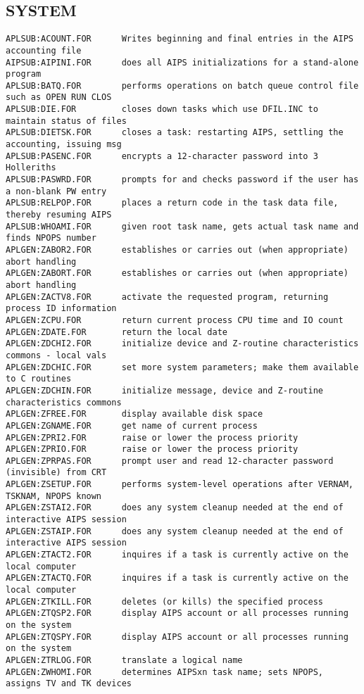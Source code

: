 \subsection{SYSTEM}
\begin{verbatim}
APLSUB:ACOUNT.FOR      Writes beginning and final entries in the AIPS accounting file
AIPSUB:AIPINI.FOR      does all AIPS initializations for a stand-alone program
APLSUB:BATQ.FOR        performs operations on batch queue control file such as OPEN RUN CLOS
APLSUB:DIE.FOR         closes down tasks which use DFIL.INC to maintain status of files
APLSUB:DIETSK.FOR      closes a task: restarting AIPS, settling the accounting, issuing msg
APLSUB:PASENC.FOR      encrypts a 12-character password into 3 Holleriths
APLSUB:PASWRD.FOR      prompts for and checks password if the user has a non-blank PW entry
APLSUB:RELPOP.FOR      places a return code in the task data file, thereby resuming AIPS
APLSUB:WHOAMI.FOR      given root task name, gets actual task name and finds NPOPS number
APLGEN:ZABOR2.FOR      establishes or carries out (when appropriate) abort handling
APLGEN:ZABORT.FOR      establishes or carries out (when appropriate) abort handling
APLGEN:ZACTV8.FOR      activate the requested program, returning process ID information
APLGEN:ZCPU.FOR        return current process CPU time and IO count
APLGEN:ZDATE.FOR       return the local date
APLGEN:ZDCHI2.FOR      initialize device and Z-routine characteristics commons - local vals
APLGEN:ZDCHIC.FOR      set more system parameters; make them available to C routines
APLGEN:ZDCHIN.FOR      initialize message, device and Z-routine characteristics commons
APLGEN:ZFREE.FOR       display available disk space
APLGEN:ZGNAME.FOR      get name of current process
APLGEN:ZPRI2.FOR       raise or lower the process priority
APLGEN:ZPRIO.FOR       raise or lower the process priority
APLGEN:ZPRPAS.FOR      prompt user and read 12-character password (invisible) from CRT
APLGEN:ZSETUP.FOR      performs system-level operations after VERNAM, TSKNAM, NPOPS known
APLGEN:ZSTAI2.FOR      does any system cleanup needed at the end of interactive AIPS session
APLGEN:ZSTAIP.FOR      does any system cleanup needed at the end of interactive AIPS session
APLGEN:ZTACT2.FOR      inquires if a task is currently active on the local computer
APLGEN:ZTACTQ.FOR      inquires if a task is currently active on the local computer
APLGEN:ZTKILL.FOR      deletes (or kills) the specified process
APLGEN:ZTQSP2.FOR      display AIPS account or all processes running on the system
APLGEN:ZTQSPY.FOR      display AIPS account or all processes running on the system
APLGEN:ZTRLOG.FOR      translate a logical name
APLGEN:ZWHOMI.FOR      determines AIPSxn task name; sets NPOPS, assigns TV and TK devices
\end{verbatim}
 
